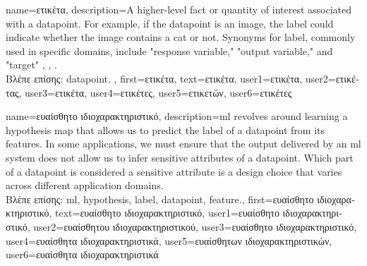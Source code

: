 {name={\foreignlanguage{greek}{ετικέτα}},
	description={A higher-level fact or quantity of interest associated with a \gls{datapoint}. 
		For example, if the \gls{datapoint} is an image, the label could indicate whether the 
		image contains a cat or not. Synonyms for label, commonly used in specific domains, 
		include "response variable," "output variable," and "target" \cite{Gujarati2021}, \cite{Dodge2003}, \cite{Everitt2022}.\\
		\foreignlanguage{greek}{Βλέπε επίσης:} \gls{datapoint}.
 },
	first={\foreignlanguage{greek}{ετικέτα}},
	text={\foreignlanguage{greek}{ετικέτα}},
	user1={\foreignlanguage{greek}{ετικέτα}}, %
  	user2={\foreignlanguage{greek}{ετικέτας}}, %
	user3={\foreignlanguage{greek}{ετικέτα}}, %
	user4={\foreignlanguage{greek}{ετικέτες}}, %
  	user5={\foreignlanguage{greek}{ετικετών}}, %
	user6={\foreignlanguage{greek}{ετικέτες}} %
}

{name={\foreignlanguage{greek}{ευαίσθητο ιδιοχαρακτηριστικό}},
	description={\gls{ml} revolves around learning a \gls{hypothesis} map that allows 
		us to predict the \gls{label} of a \gls{datapoint} from its \gls{feature}s. In some 
		applications, we must ensure that the output delivered by an \gls{ml} system does 
		not allow us to infer sensitive attributes of a \gls{datapoint}. Which part 
		of a \gls{datapoint} is considered a sensitive attribute is a design 
		choice that varies across different application domains.\\
		\foreignlanguage{greek}{Βλέπε επίσης:} \gls{ml}, \gls{hypothesis}, \gls{label}, \gls{datapoint}, \gls{feature}.},
	first={\foreignlanguage{greek}{ευαίσθητο ιδιοχαρακτηριστικό}},
	text={\foreignlanguage{greek}{ευαίσθητο ιδιοχαρακτηριστικό}},
	user1={\foreignlanguage{greek}{ευαίσθητο ιδιοχαρακτηριστικό}}, %
    	user2={\foreignlanguage{greek}{ευαίσθητου ιδιοχαρακτηριστικού}}, %
	user3={\foreignlanguage{greek}{ευαίσθητο ιδιοχαρακτηριστικό}}, %
	user4={\foreignlanguage{greek}{ευαίσθητα ιδιοχαρακτηριστικά}}, %
    	user5={\foreignlanguage{greek}{ευαίσθητων ιδιοχαρακτηριστικών}}, %
	user6={\foreignlanguage{greek}{ευαίσθητα ιδιοχαρακτηριστικά}} %
}

